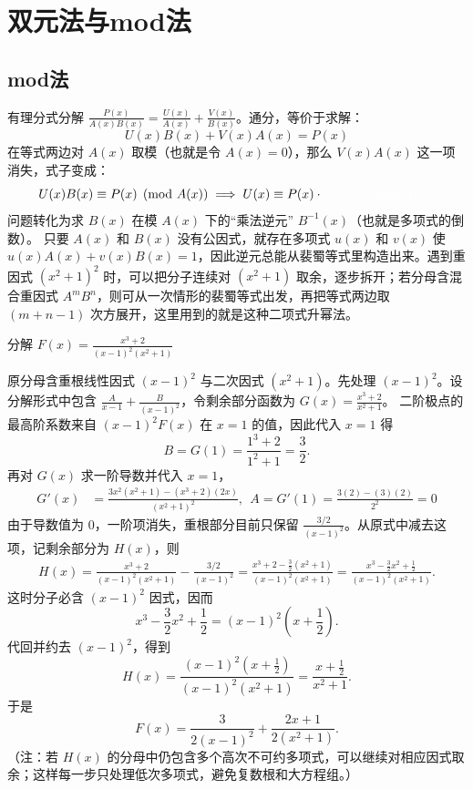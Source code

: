 \chapter{双元法与mod法}
\section{mod法}
有理分式分解 $\frac{P(x)}{A(x)B(x)}=\frac{U(x)}{A(x)} + \frac{V(x)}{B(x)}$。通分，等价于求解：
$$ U(x)B(x) + V(x)A(x) = P(x) $$
在等式两边对 $A(x)$ 取模（也就是令 $A(x)=0$），那么 $V(x)A(x)$ 这一项消失，式子变成：
$$ U(x)B(x) \equiv P(x) \pmod{A(x)} \implies U(x) \equiv P(x) \cdot \color{white}{B^{-1}(x)} \pmod{A(x)}$$
问题转化为求 $B(x)$ 在模 $A(x)$ 下的“乘法逆元” $B^{-1}(x)$（也就是多项式的倒数）。
只要 $A(x)$ 和 $B(x)$ 没有公因式，就存在多项式 $u(x)$ 和 $v(x)$ 使 $u(x)A(x) + v(x)B(x) = 1$，因此逆元总能从裴蜀等式里构造出来。遇到重因式 $(x^2+1)^2$ 时，可以把分子连续对 $(x^2+1)$ 取余，逐步拆开；若分母含混合重因式 $A^m B^n$，则可从一次情形的裴蜀等式出发，再把等式两边取 $(m+n-1)$ 次方展开，这里用到的就是这种二项式升幂法。

\begin{example}
    分解 $\displaystyle F(x) = \frac{x^3+2}{(x-1)^2(x^2+1)}$
\end{example}
\begin{solution}
原分母含重根线性因式 $(x-1)^2$ 与二次因式 $(x^2+1)$。先处理 $(x-1)^2$。设分解形式中包含 $\frac{A}{x-1} + \frac{B}{(x-1)^2}$，令剩余部分函数为 $G(x) = \frac{x^3+2}{x^2+1}$。
二阶极点的最高阶系数来自 \((x-1)^2F(x)\) 在 \(x=1\) 的值，因此代入 \(x=1\) 得
$$ B = G(1) = \frac{1^3+2}{1^2+1} = \frac{3}{2}. $$
再对 $G(x)$ 求一阶导数并代入 $x=1$，
\begin{align*}
G'(x) &= \frac{3x^2(x^2+1) - (x^3+2)(2x)}{(x^2+1)^2} ,~~A = G'(1) = \frac{3(2) - (3)(2)}{2^2} = 0
\end{align*}
由于导数值为 \(0\)，一阶项消失，重根部分目前只保留 \(\frac{3/2}{(x-1)^2}\)。从原式中减去这项，记剩余部分为 $H(x)$，则
\begin{align*}
H(x) = \frac{x^3+2}{(x-1)^2(x^2+1)} - \frac{3/2}{(x-1)^2} = \frac{x^3+2 - \frac{3}{2}(x^2+1)}{(x-1)^2(x^2+1)} = \frac{x^3 - \frac{3}{2}x^2 + \frac{1}{2}}{(x-1)^2(x^2+1)}.
\end{align*}
这时分子必含 $(x-1)^2$ 因式，因而
$$ x^3 - \frac{3}{2}x^2 + \frac{1}{2} = (x-1)^2 \left(x + \frac{1}{2}\right). $$
代回并约去 $(x-1)^2$，得到
$$ H(x) = \frac{(x-1)^2 \left(x + \frac{1}{2}\right)}{(x-1)^2(x^2+1)} = \frac{x + \frac{1}{2}}{x^2+1}. $$
于是
$$ F(x) = \frac{3}{2(x-1)^2} + \frac{2x+1}{2(x^2+1)}. $$
（注：若 $H(x)$ 的分母中仍包含多个高次不可约多项式，可以继续对相应因式取余；这样每一步只处理低次多项式，避免复数根和大方程组。）
\end{solution}


